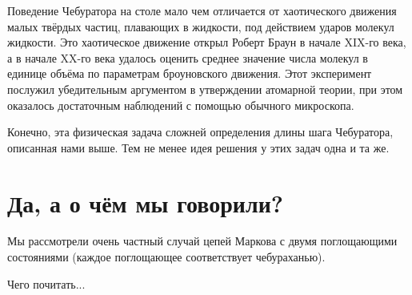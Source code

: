 \documentclass{article}
\begin{document}
Поведение Чебуратора на столе мало чем отличается 
от хаотического движения малых твёрдых частиц, плавающих в жидкости, под действием ударов молекул жидкости. 
Это хаотическое движение открыл Роберт Браун в начале XIX-го века, а в начале XX-го века удалось оценить
среднее значение числа молекул в единице объёма по параметрам броуновского движения.
Этот эксперимент послужил убедительным аргументом в утверждении атомарной теории, при этом оказалось достаточным
наблюдений с помощью обычного микроскопа.

Конечно, эта физическая задача сложней определения длины шага Чебуратора, описанная нами выше.
Тем не менее идея решения у этих задач одна и та же.



\section{Да, а о чём мы говорили?}

Мы рассмотрели очень частный случай цепей Маркова с двумя поглощающими состояниями (каждое поглощающее соответствует чебураханью). 

Чего почитать...
\end{document}
